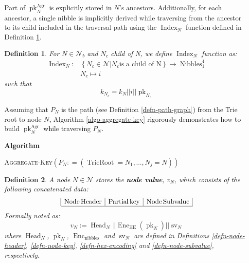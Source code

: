 \documentclass{book}
\newcommand{\assign}{:=}
\newcommand{\tmname}[1]{\textsc{#1}}
\newcommand{\tmop}[1]{\ensuremath{\operatorname{#1}}}
\newcommand{\tmstrong}[1]{\textbf{#1}}
\newcommand{\tmtextbf}[1]{{\bfseries{#1}}}
\newcommand{\tmtextsc}[1]{{\scshape{#1}}}
\newcommand{\tmtextup}[1]{{\upshape{#1}}}
\newenvironment{tmindent}{\begin{tmparmod}{1.5em}{0pt}{0pt}}{\end{tmparmod}}
\newenvironment{tmparmod}[3]{\begin{list}{}{\setlength{\topsep}{0pt}\setlength{\leftmargin}{#1}\setlength{\rightmargin}{#2}\setlength{\parindent}{#3}\setlength{\listparindent}{\parindent}\setlength{\itemindent}{\parindent}\setlength{\parsep}{\parskip}} \item[]}{\end{list}}
\newenvironment{tmparsep}[1]{\begingroup\setlength{\parskip}{#1}}{\endgroup}
\newcounter{tmcounter}
\newcommand{\custombinding}[1]{%
  \setcounter{tmcounter}{#1}%
  \addtocounter{tmcounter}{-1}%
  \refstepcounter{tmcounter}}
\newtheorem{definition}{Definition}
\providecommand{\tmname}[1]{\tmtextsc{#1}}
\providecommand{\tmop}[1]{\ensuremath{\mathrm{#1}}}
\providecommand{\tmstrong}[1]{\tmtextbf{#1}}
\providecommand{\tmtextbf}[1]{\tmtextbf{#1}}
\newtheorem{definition}{Definition}
\begin{document}
Part of $\tmop{pk}_N^{\tmop{Agr}}$ is explicitly stored in $N$'s ancestors.
Additionally, for each ancestor, a single nibble is implicitly derived while
traversing from the ancestor to its child included in the traversal path using
the $\tmop{Index}_N$ function defined in Definition \ref{defn-index-function}.

\begin{definition}
  \label{defn-index-function}For $N \in \mathcal{N}_b$ and $N_c$ child of N,
  we define {\tmstrong{$\tmop{Index}_N$}} function as:
  \[ \begin{array}{cc}
       \tmop{Index}_N : & \left\{ N_c \in \mathcal{N}|N_c  \text{is a child of
       N} \right\} \rightarrow \tmop{Nibbles}^4_1\\
       & N_c \mapsto i_{}
     \end{array} \]
  such that
  \[ k_{N_c} = k_N | | i | | \tmop{pk}_{N_c} \]
\end{definition}

Assuming that $P_N$ is the path (see Definition \ref{defn-path-graph}) from
the Trie root to node $N$, Algorithm \ref{algo-aggregate-key} rigorously
demonstrates how to build $\tmop{pk}^{\tmop{Agr}}_N$ while traversing $P_N$.

\custombinding{1}{\noindent}\begin{tmparmod}{0pt}{0pt}{0em}%
  \begin{tmparsep}{0em}%
    \tmtextbf{Algorithm \tmtextup{1}}{\smallskip}
    
    \begin{tmindent}
      \label{algo-aggregate-key}{\tmname{Aggregate-Key}}$(P_N : =
      (\tmop{TrieRoot} = N_1, \ldots, N_j = N))$
    \end{tmindent}
  \end{tmparsep}
\end{tmparmod}{\medskip}

\begin{definition}
  \label{defn-node-value}A node $N \in \mathcal{N}$ stores the {\tmstrong{node
  value}}, {\tmstrong{$v_N$}}, which consists of the following concatenated
  data:
  \[ \begin{array}{|l|l|l|}
       \hline
       \tmop{Node} \tmop{Header} & \tmop{Partial} \tmop{key} & \tmop{Node}
       \tmop{Subvalue}\\
       \hline
     \end{array} \]
  Formally noted as:
  \[ v_N \assign \tmop{Head}_N | | \tmop{Enc}_{\tmop{HE}} (\tmop{pk}_N) | |
     \tmop{sv}_N \]
  where $\tmop{Head}_N$, $\tmop{pk}_N$, $\tmop{Enc}_{\tmop{nibbles}}$ and
  $\tmop{sv}_N$ are defined in Definitions \ref{defn-node-header},
  \ref{defn-node-key}, \ref{defn-hex-encoding} and \ref{defn-node-subvalue},
  respectively.
\end{definition}
\end{document}
